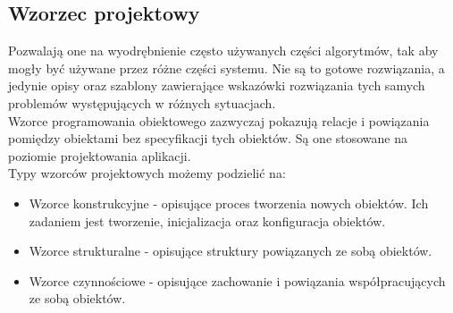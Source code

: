 \documentclass[12pt]{report}
\begin{document}
\subsection{Wzorzec projektowy}
	   Pozwalają one na wyodrębnienie często używanych części algorytmów, tak aby mogły być używane przez różne części systemu. Nie są to gotowe rozwiązania, a jedynie opisy oraz szablony zawierające wskazówki rozwiązania tych samych problemów występujących w różnych sytuacjach. \\
	\indent Wzorce programowania obiektowego zazwyczaj pokazują relacje i powiązania pomiędzy obiektami bez specyfikacji tych obiektów. Są one stosowane na poziomie projektowania aplikacji. \\
	\indent Typy wzorców projektowych możemy podzielić na:
	\begin{itemize}
		\item{Wzorce konstrukcyjne - opisujące proces tworzenia nowych obiektów. Ich zadaniem jest tworzenie, inicjalizacja oraz konfiguracja obiektów.}
		\item{Wzorce strukturalne - opisujące struktury powiązanych ze sobą obiektów.}
		\item{Wzorce czynnościowe - opisujące zachowanie i powiązania współpracujących ze sobą obiektów.}
	 \end{itemize} 
\end{document}
